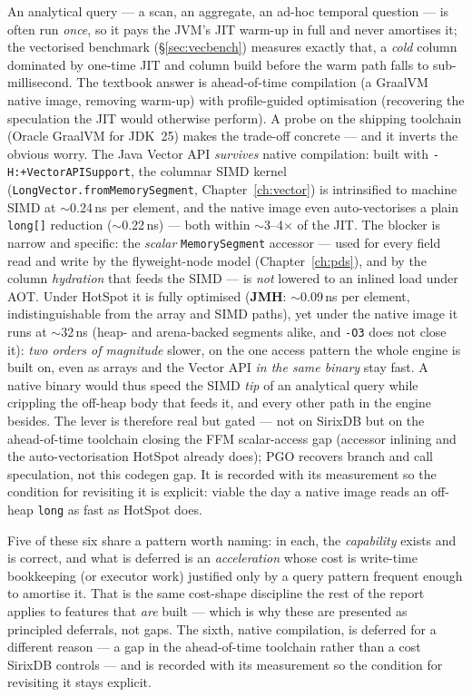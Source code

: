 \documentclass[11pt,a4paper,oneside]{report}
\theoremstyle{sirixthm}
\newcommand{\code}[1]{\texttt{#1}}
\begin{document}
An analytical query --- a scan, an aggregate, an ad-hoc temporal question --- is often run \emph{once}, so
it pays the JVM's JIT warm-up in full and never amortises it; the vectorised benchmark
(\S\ref{sec:vecbench}) measures exactly that, a \emph{cold} column dominated by one-time JIT and column
build before the warm path falls to sub-millisecond. The textbook answer is ahead-of-time compilation
(a GraalVM native image, removing warm-up) with profile-guided optimisation (recovering the speculation
the JIT would otherwise perform). A probe on the shipping toolchain (Oracle GraalVM for JDK~25) makes the
trade-off concrete --- and it inverts the obvious worry. The Java Vector API \emph{survives} native
compilation: built with \code{-H:+VectorAPISupport}, the columnar SIMD kernel
(\code{LongVector.fromMemorySegment}, Chapter~\ref{ch:vector}) is intrinsified to machine SIMD at
$\sim$0.24\,ns per element, and the native image even auto-vectorises a plain \code{long[]} reduction
($\sim$0.22\,ns) --- both within $\sim$3--4$\times$ of the JIT. The blocker is narrow and specific: the
\emph{scalar} \code{MemorySegment} accessor --- used for every field read and write by the flyweight-node
model (Chapter~\ref{ch:pds}), and by the column \emph{hydration} that feeds the SIMD --- is \emph{not}
lowered to an inlined load under AOT. Under HotSpot it is fully optimised (\textbf{JMH}: $\sim$0.09\,ns per
element, indistinguishable from the array and SIMD paths), yet under the native image it runs at
$\sim$32\,ns (heap- and arena-backed segments alike, and \code{-O3} does not close it): \emph{two orders of
magnitude} slower, on the one access pattern the whole engine is built on, even as arrays and the Vector
API \emph{in the same binary} stay fast. A native binary would thus speed the SIMD \emph{tip} of an
analytical query while crippling the off-heap body that feeds it, and every other path in the engine
besides. The lever is therefore real but gated --- not on SirixDB but on the ahead-of-time toolchain
closing the FFM scalar-access gap (accessor inlining and the auto-vectorisation HotSpot already does); PGO
recovers branch and call speculation, not this codegen gap. It is recorded with its measurement so the
condition for revisiting it is explicit: viable the day a native image reads an off-heap \code{long} as
fast as HotSpot does.

Five of these six share a pattern worth naming: in each, the \emph{capability} exists and is correct, and what is
deferred is an \emph{acceleration} whose cost is write-time bookkeeping (or executor work) justified only by
a query pattern frequent enough to amortise it. That is the same cost-shape discipline the rest of the
report applies to features that \emph{are} built --- which is why these are presented as principled
deferrals, not gaps. The sixth, native compilation, is deferred for a different reason --- a gap in the
ahead-of-time toolchain rather than a cost SirixDB controls --- and is recorded with its measurement so
the condition for revisiting it stays explicit.
\end{document}
